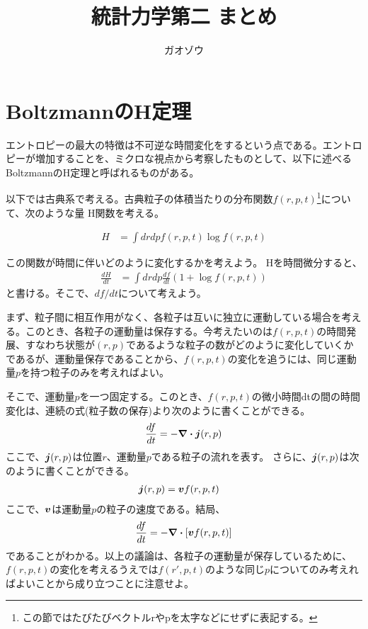 \documentclass[uplatex,dvipdfmx]{jsarticle}
\title{統計力学第二 まとめ}
\author{ガオゾウ}
\begin{document}
\maketitle
\section{BoltzmannのH定理}
エントロピーの最大の特徴は不可逆な時間変化をするという点である。エントロピーが増加することを、ミクロな視点から考察したものとして、以下に述べるBoltzmannのH定理と呼ばれるものがある。

以下では古典系で考える。古典粒子の体積当たりの分布関数$f(r,p,t)$\footnote{この節ではたびたびベクトルrやpを太字などにせずに表記する。}について、次のような量 H関数を考える。

\begin{align}
    H &= \int drdp f(r,p,t) \log f(r,p,t)
\end{align}

この関数が時間に伴いどのように変化するかを考えよう。
Hを時間微分すると、
\begin{align}
    \frac{dH}{dt} &= \int drdp \frac{df}{dt}(1+\log f(r,p,t)) \label{eq:dHdt}
\end{align}
と書ける。そこで、$df/dt$について考えよう。

まず、粒子間に相互作用がなく、各粒子は互いに独立に運動している場合を考える。このとき、各粒子の運動量は保存する。今考えたいのは$f(r,p,t)$の時間発展、すなわち状態が$(r,p)$であるような粒子の数がどのように変化していくかであるが、運動量保存であることから、$f(r,p,t)$の変化を追うには、同じ運動量$p$を持つ粒子のみを考えればよい。

そこで、運動量$p$を一つ固定する。このとき、$f(r,p,t)$の微小時間dtの間の時間変化は、連続の式(粒子数の保存)より次のように書くことができる。
\begin{align}
    \frac{df}{dt} = - \div \vb*{j}(r,p) 
\end{align}
ここで、$\vb*{j}(r,p)$は位置$r$、運動量$p$である粒子の流れを表す。
さらに、$\vb*{j}(r,p)$は次のように書くことができる。
\begin{align}
    \vb*{j}(r,p) &= \vb*{v} f(r,p,t)
\end{align}
ここで、$\vb*{v}$は運動量$p$の粒子の速度である。結局、
\begin{align}
    \frac{df}{dt} = - \div [\vb*{v}f(r,p,t)] \label{eq:dfdt_no_int}
\end{align}
であることがわかる。以上の議論は、各粒子の運動量が保存しているために、$f(r,p,t)$の変化を考えるうえでは$f(r',p,t)$のような同じ$p$についてのみ考えればよいことから成り立つことに注意せよ。
\end{document}
